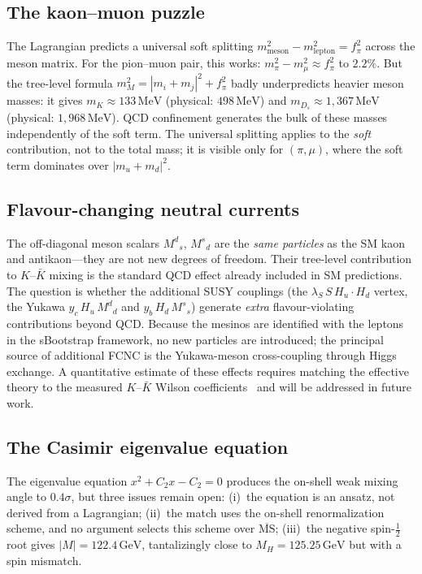 \documentclass[12pt,a4paper]{article}
\newcommand{\MeV}{\,\text{MeV}}
\newcommand{\GeV}{\,\text{GeV}}
\newcommand{\fpi}{f_\pi}
\begin{document}
\subsection{The kaon--muon puzzle}
The Lagrangian predicts a universal soft splitting
$m^2_{\text{meson}} - m^2_{\text{lepton}} = \fpi^2$ across the
meson matrix. For the pion--muon pair, this works:
$m_\pi^2 - m_\mu^2 \approx \fpi^2$ to $2.2\%$. But the
tree-level formula $m^2_M = |m_i + m_j|^2 + \fpi^2$ badly
underpredicts heavier meson masses: it gives $m_K \approx 133\MeV$
(physical: $498\MeV$) and $m_{D_s} \approx 1{,}367\MeV$
(physical: $1{,}968\MeV$). QCD confinement generates the bulk
of these masses independently of the soft term. The universal
splitting applies to the \emph{soft} contribution, not to the
total mass; it is visible only for $(\pi, \mu)$,
where the soft term dominates over $|m_u + m_d|^2$.

\subsection{Flavour-changing neutral currents}
The off-diagonal meson scalars $M^d{}_s$, $M^s{}_d$ are the
\emph{same particles} as the SM kaon and antikaon---they are not
new degrees of freedom.  Their tree-level contribution to
$K$--$\bar K$ mixing is the standard QCD effect already
included in SM predictions.  The question is whether the
additional SUSY couplings (the $\lambda_S\,S\,H_u\!\cdot\!H_d$
vertex, the Yukawa $y_c\,H_u\,M^d{}_d$ and
$y_b\,H_d\,M^s{}_s$) generate \emph{extra} flavour-violating
contributions beyond QCD.  Because the mesinos are identified
with the leptons in the sBootstrap framework, no new particles
are introduced; the principal source of additional FCNC is the
Yukawa-meson cross-coupling through Higgs exchange.  A
quantitative estimate of these effects requires matching the
effective theory to the measured $K$--$\bar K$ Wilson
coefficients~\cite{UTfit} and will be addressed in future work.

\subsection{The Casimir eigenvalue equation}
The eigenvalue equation $x^2 + C_2 x - C_2 = 0$ produces the
on-shell weak mixing angle to $0.4\sigma$, but three issues
remain open: (i)~the equation is an ansatz, not derived from a
Lagrangian; (ii)~the match uses the on-shell renormalization
scheme, and no argument selects this scheme over $\overline{\text{MS}}$;
(iii)~the negative spin-$\tfrac{1}{2}$ root gives $|M| = 122.4\GeV$,
tantalizingly close to $M_H = 125.25\GeV$ but with a spin mismatch.
\end{document}
